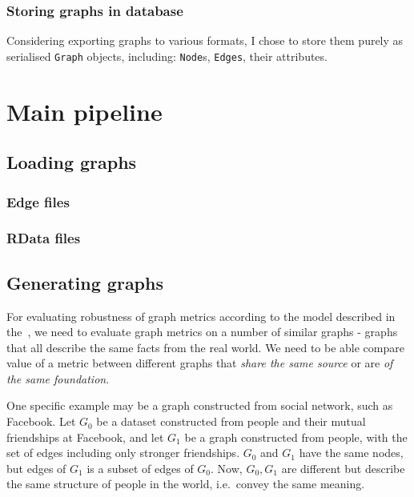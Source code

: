 \subsubsection*{Storing graphs in database}

Considering exporting graphs to various formats, I chose to store them purely as serialised \texttt{Graph} objects, including: \texttt{Node}s, \texttt{Edges}, their attributes.




\section{Main pipeline}\label{sec:main_pipeline}

\subsection{Loading graphs}

\subsubsection{Edge files}

\subsubsection{RData files}


\subsection{Generating graphs}


For evaluating robustness of graph metrics according to the model described in the~, we need to evaluate graph metrics on a number of similar graphs - graphs that all describe the same facts from the real world.
We need to be able compare value of a metric between different graphs that \textit{share the same source} or are \textit{of the same foundation}.

One specific example may be a graph constructed from social network, such as Facebook.
Let $G_0$ be a dataset constructed from people and their mutual friendships at Facebook, and let $G_1$ be a graph constructed from people, with the set of edges including only stronger friendships. $G_0$ and $G_1$ have the same nodes, but edges of $G_1$ is a subset of edges of $G_0$.
Now, $G_0, G_1$ are different but describe the same structure of people in the world, i.e.\ convey the same meaning.


